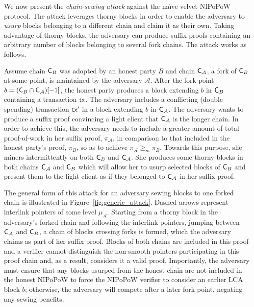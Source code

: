 We now present the \emph{chain-sewing attack} against the na\"ive velvet NIPoPoW
protocol. The attack leverages thorny blocks in order to enable the adversary to
\emph{usurp} blocks belonging to a different chain and claim it as their own.
Taking advantage of thorny blocks, the adversary can produce suffix proofs
containing an arbitrary number of blocks belonging to several fork chains. The
attack works as follows.

Assume chain $\mathsf{C}_B$ was adopted by an honest party $B$ and chain $\mathsf{C}_\mathcal{A}$, a fork of $\mathsf{C}_B$ at some point, is maintained by the adversary $\mathcal{A}$. After the fork point $b = (\mathsf{C}_B \cap \mathsf{C}_\mathcal{A})[-1]$, the honest party produces a block extending $b$ in $\mathsf{C}_B$ containing a transaction $\mathsf{tx}$. The adversary includes a conflicting (double spending) transaction $\mathsf{tx}'$ in a block extending $b$ in $\mathsf{C}_\mathcal{A}$.
The adversary wants to produce a suffix proof convincing a light client that $\mathsf{C}_\mathcal{A}$ is the longer chain. In order to achieve this, the adversary needs to include a greater amount of total proof-of-work in her suffix proof, $\pi_\mathcal{A}$, in comparison to that included in the honest party's proof, $\pi_B$, so as to achieve $\pi_\mathcal{A} \geq_m \pi_B$. Towards this purpose, she miners intermittently on both $\mathsf{C}_B$ and $\mathsf{C}_\mathcal{A}$. She produces some thorny blocks in both chains $\mathsf{C}_\mathcal{A}$ and $\mathsf{C}_B$ which will allow her to usurp selected blocks of $\mathsf{C}_B$ and present them to the light client as if they belonged to $\mathsf{C}_\mathcal{A}$ in her suffix proof.

The general form of this attack for an adversary sewing blocks to one forked chain is illustrated in Figure~\ref{fig:generic_attack}. Dashed arrows represent interlink pointers of some level $\mu_\mathcal{A}$. Starting from a thorny block in the adversary's forked chain and following the interlink pointers, jumping between $\mathsf{C}_\mathcal{A}$ and $\mathsf{C}_B$, a chain of blocks crossing forks is formed, which the adversary claims as part of her suffix proof. Blocks of both chains are included in this proof and a verifier cannot distinguish the non-smooth pointers participating in this proof chain and, as a result, considers it a valid proof. Importantly, the adversary must ensure that any blocks usurped from the honest chain are not included in the honest NIPoPoW to force the NIPoPoW verifier to consider an earlier LCA block $b$; otherwise, the adversary will compete after a later fork point, negating any sewing benefits.

